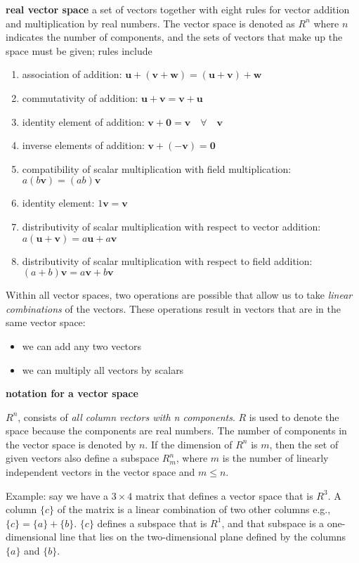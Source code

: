 \documentclass[letterpaper, 10pt, oneside]{article}
\newenvironment{dd}[1]{
	\noindent
	\textbf{\normalsize{#1}}
	\hspace{0.1in}
	\small
	\rmfamily
	}
	{\medskip}
\begin{document}
\begin{dd}{real vector space} a set of vectors together with eight rules for vector addition and multiplication by real numbers. The vector space is denoted as $R^n$ where $n$ indicates the number of components, and the sets of vectors that make up the space must be given; rules include
	\begin{enumerate}
		\item association of addition: $\mathbf{u + (v+w) = (u+v)+w}$
		\item commutativity of addition: $\mathbf{u+v=v+u}$
		\item identity element of addition: $\mathbf{v + 0=v \quad\forall \quad v}$
		\item inverse elements of addition: $\mathbf{v + (-v)=0}$
		\item compatibility of scalar multiplication with field multiplication: $a(b\mathbf{v})=(ab)\mathbf{v}$
		\item identity element: $1\mathbf{v = v}$
		\item distributivity of scalar multiplication with respect to vector addition: $a\mathbf{(u+v)}=a\mathbf{u} + a\mathbf{v}$
		\item distributivity of scalar multiplication with respect to field addition: $(a+b)\mathbf{v}= a\mathbf{v}+b\mathbf{v}$
	\end{enumerate}
Within all vector spaces, two operations are possible that allow us to take \emph{linear combinations} of the vectors. These operations result in vectors that are in the same vector space:
\begin{itemize}
	\item we can add any two vectors
	\item we can multiply all vectors by scalars
\end{itemize}

\end{dd}

\begin{dd}{notation for a vector space}
$R^n$, consists of \emph{all column vectors with n components}. $R$ is used to denote the space because the components are real numbers.  The number of components in the vector space is denoted by $n$. If the dimension of $R^n$ is $m$, then the set of given vectors also define a subspace $R^n_m$, where $m$  is the number of linearly independent vectors in the vector space and $m \le n$.

Example: say we have a $3 \times 4$ matrix that defines a vector space that is $R^3$. A column $\{c\}$ of the matrix is a linear combination of two other columns e.g., $\{c\} = \{a\} + \{b\}$.  $\{c\}$ defines a subspace that is $R^1$, and that subspace is a one-dimensional line that lies on the two-dimensional plane defined by the columns $\{a\}$ and $\{b\}$.  
\end{dd}
\end{document}
